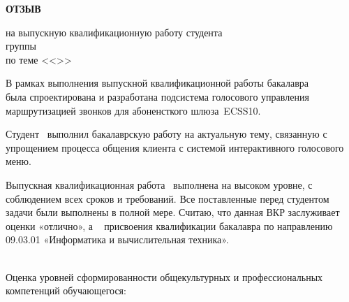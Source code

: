 
\vspace{0.1cm}
\begin{center}
    \LARGE
    {\bf ОТЗЫВ} \\
    \normalsize
\end{center}
\begin{center}
    на выпускную квалификационную работу студента \\
    группы \group\ \fio \\
    по теме <<\topicname>>
\end{center}

В рамках выполнения выпускной квалификационной работы бакалавра \\ \fioa
была спроектирована и разработана подсистема голосового управления
маршрутизацией звонков для абоненсткого шлюза~ECSS10.

Студент \fio~выполнил бакалаврскую работу на актуальную тему, связанную с
упрощением процесса общения клиента с системой интерактивного голосового меню.

Выпускная квалификационная работа \fio\ выполнена на высоком уровне, с соблюдением
всех сроков и требований. Все поставленные перед студентом задачи были выполнены
в полной мере. Считаю, что данная ВКР заслуживает оценки «отлично», а \fio~
присвоения квалификации бакалавра по направлению 09.03.01 «Информатика и вычислительная техника».

\hfill \\

Оценка уровней сформированности общекультурных и профессиональных
компетенций обучающегося:

